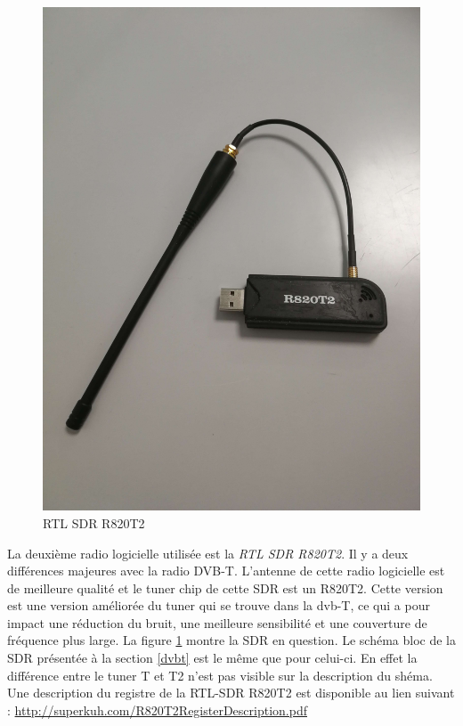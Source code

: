 \begin{figure}[h]
\centering

\includegraphics[scale=0.08]{images/r820t2.png}
\caption{RTL SDR R820T2}\label{term32}
\end{figure}

La deuxième radio logicielle utilisée est la \textit{RTL SDR R820T2}. Il y a deux différences majeures avec la radio DVB-T. L'antenne de cette radio logicielle est de meilleure qualité et le tuner chip de cette SDR est un R820T2. Cette version est une version améliorée du tuner qui se trouve dans la dvb-T, ce qui a pour impact une réduction du bruit, une meilleure sensibilité et une couverture de fréquence plus large. La figure \ref{term32} montre la SDR en question. Le schéma bloc de la SDR présentée à la section \ref{dvbt} est le même que pour celui-ci. En effet la différence entre le tuner T et T2 n'est pas visible sur la description du shéma. Une description du registre de la RTL-SDR R820T2 est disponible au lien suivant : \href{http://superkuh.com/R820T2_Register_Description.pdf}{http://superkuh.com/R820T2RegisterDescription.pdf}


